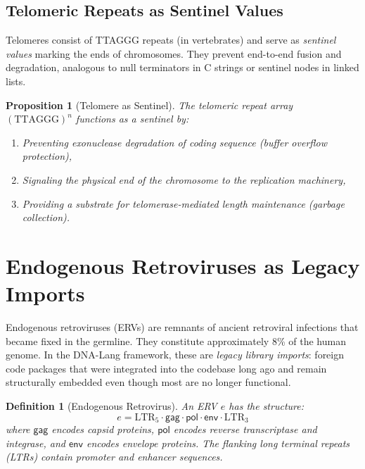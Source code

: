 \documentclass[12pt,a4paper]{article}
\newtheorem{proposition}[theorem]{Proposition}
\newtheorem{definition}[theorem]{Definition}
\begin{document}
\subsection{Telomeric Repeats as Sentinel Values}

Telomeres consist of TTAGGG repeats (in vertebrates) and serve as \emph{sentinel values}
marking the ends of chromosomes. They prevent end-to-end fusion and degradation, analogous
to null terminators in C strings or sentinel nodes in linked lists.

\begin{proposition}[Telomere as Sentinel]\label{prop:telomere}
The telomeric repeat array $(\mathrm{TTAGGG})^n$ functions as a sentinel by:
\begin{enumerate}[label=(\roman*)]
  \item Preventing exonuclease degradation of coding sequence (buffer overflow protection),
  \item Signaling the physical end of the chromosome to the replication machinery,
  \item Providing a substrate for telomerase-mediated length maintenance (garbage collection).
\end{enumerate}
\end{proposition}


\section{Endogenous Retroviruses as Legacy Imports}\label{sec:ervs}

Endogenous retroviruses (ERVs) are remnants of ancient retroviral infections that
became fixed in the germline. They constitute approximately 8\% of the human genome.
In the DNA-Lang framework, these are \emph{legacy library imports}: foreign code
packages that were integrated into the codebase long ago and remain structurally
embedded even though most are no longer functional.

\begin{definition}[Endogenous Retrovirus]\label{def:erv}
An ERV $e$ has the structure:
\[
  e = \mathrm{LTR}_5 \cdot \mathsf{gag} \cdot \mathsf{pol} \cdot \mathsf{env} \cdot \mathrm{LTR}_3
\]
where $\mathsf{gag}$ encodes capsid proteins, $\mathsf{pol}$ encodes reverse
transcriptase and integrase, and $\mathsf{env}$ encodes envelope proteins. The
flanking long terminal repeats (LTRs) contain promoter and enhancer sequences.
\end{definition}
\end{document}
